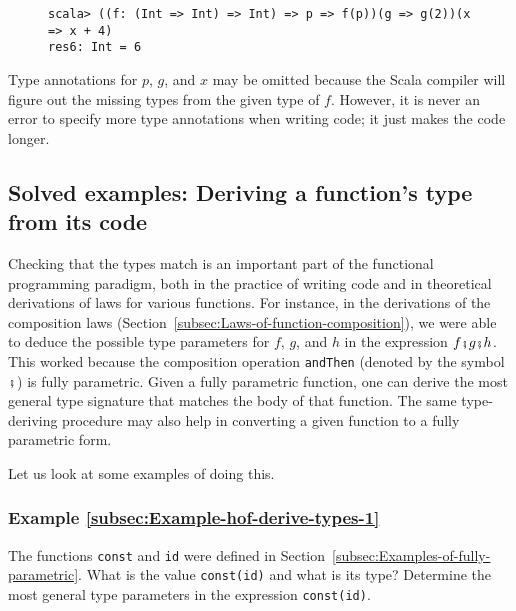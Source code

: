 \begin{wrapfigure}{l}{0.69\columnwidth}%
\vspace{-0.75\baselineskip}
\begin{lstlisting}
scala> ((f: (Int => Int) => Int) => p => f(p))(g => g(2))(x => x + 4)
res6: Int = 6
\end{lstlisting}
\vspace{-1\baselineskip}
\end{wrapfigure}%

\noindent Type annotations for $p$, $g$, and $x$ may be omitted
because the Scala compiler will figure out the missing types from
the given type of $f$. However, it is never an error to specify more
type annotations when writing code; it just makes the code longer.

\subsection{Solved examples: Deriving a function\textsf{'}s type from its code}

Checking that the types match is an important part of the functional
programming paradigm, both in the practice of writing code and in
theoretical derivations of laws for various functions. For instance,
in the derivations of the composition laws (Section~\ref{subsec:Laws-of-function-composition}),
we were able to deduce the possible type parameters for $f$, $g$,
and $h$ in the expression $f\bef g\bef h$. This worked because the
composition operation \lstinline!andThen! (denoted by the symbol
$\bef$) is fully parametric. Given a fully parametric function, one
can derive the most general type signature that matches the body of
that function. The same type-deriving procedure may also help in converting
a given function to a fully parametric form.

Let us look at some examples of doing this.

\subsubsection{Example \label{subsec:Example-hof-derive-types-1}\ref{subsec:Example-hof-derive-types-1}}

The functions \lstinline!const! and \lstinline!id! were defined
in Section~\ref{subsec:Examples-of-fully-parametric}. What is the
value \lstinline!const(id)! and what is its type? Determine the most
general type parameters in the expression \lstinline!const(id)!.


